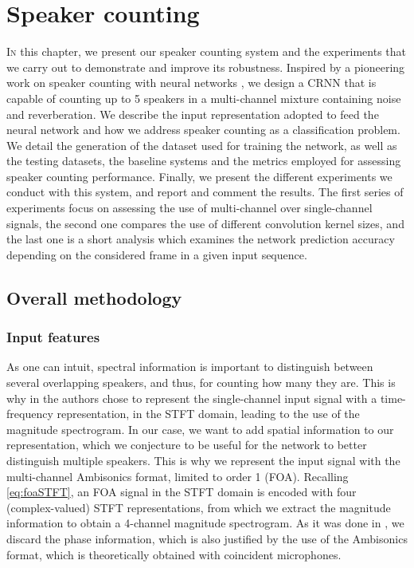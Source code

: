 \chapter{Speaker counting}
\label{chap:counting}

\lettrine{I}{n} this chapter, we present our speaker counting system and the experiments that we carry out to demonstrate and improve its robustness. Inspired by a pioneering work on speaker counting with neural networks \cite{stoter_countnet:_2019}, we design a CRNN that is capable of counting up to 5 speakers in a multi-channel mixture containing noise and reverberation. We describe the input representation adopted to feed the neural network and how we address speaker counting as a classification problem. We detail the generation of the dataset used for training the network, as well as the testing datasets, the baseline systems and the metrics employed for assessing speaker counting performance. Finally, we present the different experiments we conduct with this system, and report and comment the results. The first series of experiments focus on assessing the use of multi-channel over single-channel signals, the second one compares the use of different convolution kernel sizes, and the last one is a short analysis which examines the network prediction accuracy depending on the considered frame in a given input sequence.

\section{Overall methodology}

\subsection{Input features}

As one can intuit, spectral information is important to distinguish between several overlapping speakers, and thus, for counting how many they are. This is why in \cite{stoter_countnet:_2019} the authors chose to represent the single-channel input signal with a time-frequency representation, in the STFT domain, leading to the use of the magnitude spectrogram. In our case, we want to add spatial information to our representation, which we conjecture to be useful for the network to better distinguish multiple speakers. This is why we represent the input signal with the multi-channel Ambisonics format, limited to order 1 (FOA). Recalling \eqref{eq:foaSTFT}, an FOA signal in the STFT domain is encoded with four (complex-valued) STFT representations, from which we extract the magnitude information to obtain a 4-channel magnitude spectrogram. As it was done in \cite{stoter_countnet:_2019}, we discard the phase information, which is also justified by the use of the Ambisonics format, which is theoretically obtained with coincident microphones.


